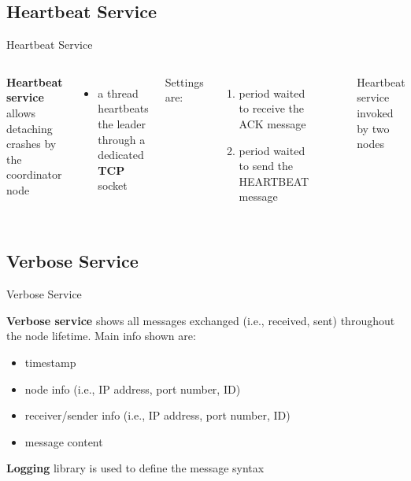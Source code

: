 \documentclass{beamer}
\begin{document}
	    \subsection{Heartbeat Service}
	    
	    \begin{frame}{Heartbeat Service}
	    
	   \begin{columns}
	    
	    \textbf{Heartbeat service} allows detaching crashes by the coordinator node
	    
	    \begin{itemize}
	        \item a thread heartbeats the leader through a dedicated \textbf{TCP} socket
	    \end{itemize}
	    \pause
	    
	    Settings are:
	    
	    \begin{enumerate}
	        \item period waited to receive the ACK message
	        \item period waited to send the HEARTBEAT message
	    \end{enumerate}
	    
	    
	    \begin{figure}
          \centering
          
          \caption{Heartbeat service invoked by two nodes}
        \end{figure}
	     \end{columns}
	     
	    \end{frame}
	    
	    \subsection{Verbose Service}
	    
	    \begin{frame}{Verbose Service}
	    
	    \textbf{Verbose service} shows all messages exchanged (i.e., received, sent) throughout the node lifetime. Main info shown are:
        \begin{itemize}
            \item timestamp
            \item node info (i.e., IP address, port number, ID)
            \item receiver/sender info (i.e., IP address, port number, ID)
            \item message content
        \end{itemize}	
        
        \pause
        
        \textbf{Logging} library is used to define the message syntax
        
        \lstI
        
	    \end{frame}
	    
\end{document}
